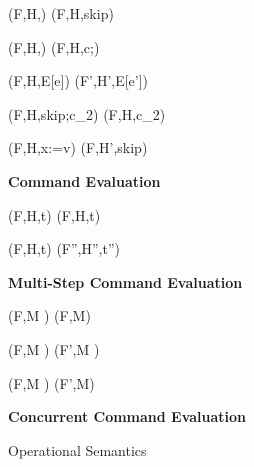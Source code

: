 \begin{figure*}
\infrule[C-WhileFalse]
{}
{(F,H,) \rightarrow (F,H,skip)}

{(F,H,) \rightarrow (F,H,c;)}

{(F,H,E[e])  (F',H',E[e'])}

\infrule[C-SkipSeq]
{}
{(F,H,skip;c_2) \rightarrow (F,H,c_2)}

{(F,H,x:=v) \rightarrow (F,H',skip)}
\centerline{\textbf{Command Evaluation}}

\infrule[T-Refl]
{}
{(F,H,t)  \opsteps{[]} (F,H,t)}

{(F,H,t)  (F'',H'',t'')}
\centerline{\textbf{Multi-Step Command Evaluation}}

\infrule[M-skip]
{}
{(F,M \uplus {}) \rightarrow (F,M)}

{(F,M \uplus {}) \rightarrow (F',M \uplus {})}

{(F,M \uplus {}) \rightarrow (F',M)} %
\centerline{\textbf{Concurrent Command Evaluation}}

\caption{Operational Semantics}
\end{figure*}


